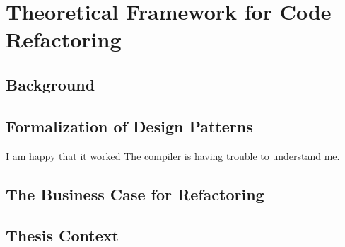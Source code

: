 \chapter{Theoretical Framework for Code Refactoring}

\section{Background}
\section{Formalization of Design Patterns}
I am happy that it worked
The compiler is having trouble to understand me.
\section{The Business Case for Refactoring}
\section{Thesis Context}
